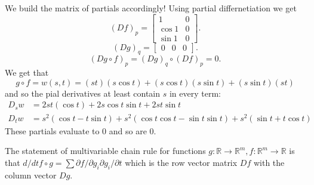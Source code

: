 \documentclass[letter]{article}
\newenvironment{menumerate}{%
  \edef\backupindent{\the\parindent}%
  \enumerate%
  \setlength{\parindent}{\backupindent}%
}{\endenumerate}
\begin{document}
\begin{menumerate}
             We build the matrix of partials accordingly! 
            Using partial differnetiation we get 
            \begin{equation}
                (Df)_p = \left[
                \begin{array}{cc}
                    1 & 0 \\
                    \cos 1 & 0 \\
                    \sin 1 & 0
                \end{array}
                \right].
            \end{equation}
        \begin{equation}
                (Dg)_q = \left[
                \begin{array}{ccc}
                     0 & 0 & 0
                \end{array}
                \right].
            \end{equation}
         \begin{equation}
            (Dg\circ f)_p = (Dg)_q\circ (Df)_p = 0.
            \end{equation}
        We get that 
        \begin{equation}
            g \circ f = w(s,t) = (st)(s\cos t) + (s\cos t) (s \sin t) + (s \sin t)(st)       
        \end{equation}
        and so the pial derivatives at least contain $s$ in every term:
        \begin{equation}
        \begin{aligned}
            D_s w &= 2st(\cos t) + 2s \cos t \sin t + 2s t \sin t \\
            D_t w &= s^2(\cos t - t\sin t) + s^2(\cos t \cos t - \sin t \sin t) + s^2 (\sin t + t \cos t)
         \end{aligned} 
        \end{equation}
        These partials evaluate to 0 and so are 0.

        The statement of multivariable chain rule for functions $g: \mathbb{R} \to \mathbb{R}^m, f:\mathbb{R}^m \to \mathbb{R}$ is that
        $d/dt f \circ g = \sum \partial f/\partial g_i \partial g_i /\partial t$ which is the row vector
        matrix $Df$ with the column vector $Dg.$
    \item
    \item
    \item
    \item
    \item

    \setcounter{enumi}{23}
    \item
    \item
\end{menumerate}

\end{document}
